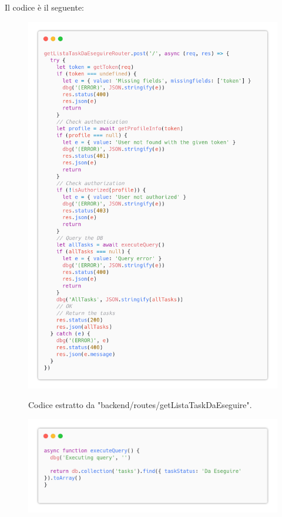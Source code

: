 \documentclass{report}
\begin{document}
Il codice è il seguente:
\begin{figure}[H]
	\centering\includegraphics[width=1\textwidth]{images/code_da_eseguire.png}
	
	Codice estratto da "backend/routes/getListaTaskDaEseguire".
\end{figure}
\begin{figure}[H]
	\centering\includegraphics[width=1\textwidth]{images/code_da_eseguire2.png}
\end{figure}
\end{document}
